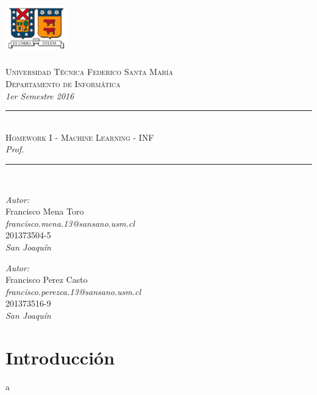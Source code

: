\documentclass[10pt]{article}
\newcommand{\HRule}{\rule{\linewidth}{0.25mm}}
\begin{document}
\begin{center}
\includegraphics[width=0.2\textwidth]{images/logo_usm}~\\[1.2cm]
~\\[-1.5cm]

\textsc{\large Universidad T\'ecnica Federico Santa Mar\'ia}\\[0.2cm]
\textsc{\large Departamento de Inform\'atica}\\[0.2cm]
\textit{1er Semestre 2016}\\[4cm]

\HRule \\[0.6cm]
{\Large \textsc{Homework I - Machine Learning - INF}}\\[0.4cm]
{\Large \textit{Prof. }}\\[0.1cm]
\HRule \\[0.8cm]

\begin{minipage}{0.4\textwidth}
\begin{center}
\emph{Autor:}\\
Francisco Mena Toro\\ \textit{francisco.mena.13@sansano.usm.cl} \\ 201373504-5 \\
\emph{San Joaqu\'in}
\end{center}
\end{minipage}
\begin{minipage}{0.4\textwidth}
\begin{center}
\emph{Autor:}\\
Francisco Perez Casto\\ \textit{francisco.perezca.13@sansano.usm.cl} \\ 201373516-9 \\
\emph{San Joaqu\'in}
\end{center}
\end{minipage}
\end{center}

\vspace{2cm}

\newpage


\section{Introducción}
a\\
\end{document}
